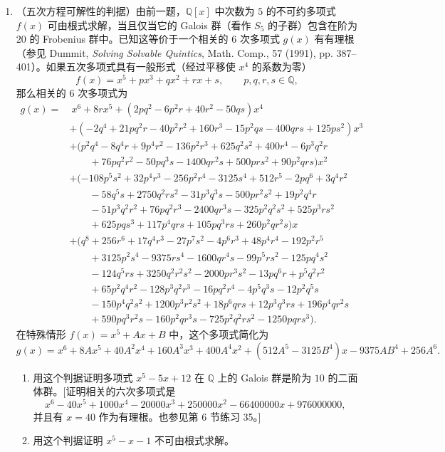 \begin{enumerate}[label=\arabic*.]
\item （五次方程可解性的判据）由前一题，$\mathbb Q[x]$ 中次数为 $5$ 的不可约多项式 $f(x)$ 可由根式求解，当且仅当它的 Galois 群（看作 $S_5$ 的子群）包含在阶为 $20$ 的 Frobenius 群中。已知这等价于一个相关的 $6$ 次多项式 $g(x)$ 有有理根（参见 Dummit, \emph{Solving Solvable Quintics}, Math. Comp., 57 (1991), pp. 387--401）。如果五次多项式具有一般形式（经过平移使 $x^4$ 的系数为零）
\[
f(x)=x^5+px^3+qx^2+rx+s,
\qquad p,q,r,s\in\mathbb Q,
\]
那么相关的 $6$ 次多项式为
\[
\begin{aligned}
g(x)=&\ x^6+8rx^5+(2pq^2-6p^2r+40r^2-50qs)x^4\\
&+(-2q^4+21pq^2r-40p^2r^2+160r^3-15p^2qs-400qrs+125ps^2)x^3\\
&+(p^2q^4-8q^4r+9p^4r^2-136p^2r^3+625q^2s^2+400r^4-6p^3q^2r\\
&\qquad +76pq^2r^2-50pq^3s-1400qr^2s+500prs^2+90p^2qrs)x^2\\
&+(-108p^5s^2+32p^4r^3-256p^2r^4-3125s^4+512r^5-2pq^6+3q^4r^2\\
&\qquad -58q^5s+2750q^2rs^2-31p^3q^3s-500pr^2s^2+19p^2q^4r\\
&\qquad -51p^3q^2r^2+76pq^2r^3-2400qr^3s-325p^2q^2s^2+525p^3rs^2\\
&\qquad +625pqs^3+117p^4qrs+105pq^3rs+260p^2qr^2s)x\\
&+(q^8+256r^6+17q^4r^3-27p^7s^2-4p^6r^3+48p^4r^4-192p^2r^5\\
&\qquad +3125p^2s^4-9375rs^4-1600qr^4s-99p^5rs^2-125pq^4s^2\\
&\qquad -124q^5rs+3250q^2r^2s^2-2000pr^3s^2-13pq^6r+p^5q^2r^2\\
&\qquad +65p^2q^4r^2-128p^3q^2r^3-16pq^2r^4-4p^5q^3s-12p^2q^5s\\
&\qquad -150p^4q^2s^2+1200p^3r^2s^2+18p^6qrs+12p^3q^3rs+196p^4qr^2s\\
&\qquad +590pq^3r^2s-160p^2qr^3s-725p^2q^2rs^2-1250pqrs^3).
\end{aligned}
\]
在特殊情形 $f(x)=x^5+Ax+B$ 中，这个多项式简化为
\[
g(x)=x^6+8Ax^5+40A^2x^4+160A^3x^3+400A^4x^2+(512A^5-3125B^4)x-9375AB^4+256A^6.
\]
\begin{enumerate}[label=(\alph*)]
\item 用这个判据证明多项式 $x^5-5x+12$ 在 $\mathbb Q$ 上的 Galois 群是阶为 $10$ 的二面体群。[证明相关的六次多项式是
\[
x^6-40x^5+1000x^4-20000x^3+250000x^2-66400000x+976000000,
\]
并且有 $x=40$ 作为有理根。也参见第 6 节练习 35。]
\item 用这个判据证明 $x^5-x-1$ 不可由根式求解。
\end{enumerate}
\end{enumerate}

